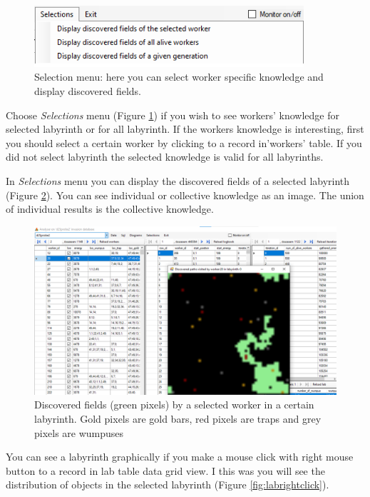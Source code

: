 \documentclass[a4paper,12pt]{article}
\begin{document}
\begin{figure}
	\begin{center}
		\includegraphics[width=10cm]{mnuselections.png}
		\caption{Selection menu: here you can select worker specific knowledge and display discovered fields.}
		\label{fig:mnuselections}
	\end{center}
\end{figure}

Choose \textit{Selections} menu (Figure \ref{fig:mnuselections}) if you wish to see workers' knowledge for selected labyrinth or for all labyrinth. If the workers knowledge is interesting, first you should select a certain worker by clicking to a record in'workers' table. If you did not select labyrinth the selected knowledge is valid for all labyrinths.

In \textit{Selections} menu you can display the discovered fields of a selected labyrinth (Figure \ref{fig:discoverlab1}). You can see individual or collective knowledge as an image. The union of individual results is the collective knowledge.


\begin{figure}
	\begin{center}
		\includegraphics[width=13cm]{discoverlab1.png}
		\caption{Discovered fields (green pixels) by a selected worker in a certain labyrinth. Gold pixels are gold bars, red pixels are traps and grey pixels are wumpuses}
		\label{fig:discoverlab1}
	\end{center}
\end{figure}

You can see a labyrinth graphically if you make a mouse click with right mouse button to a record in lab table data grid view. I  this was you will see the distribution of objects in the selected labyrinth (Figure \ref{fig:labrightclick}).
\end{document}
